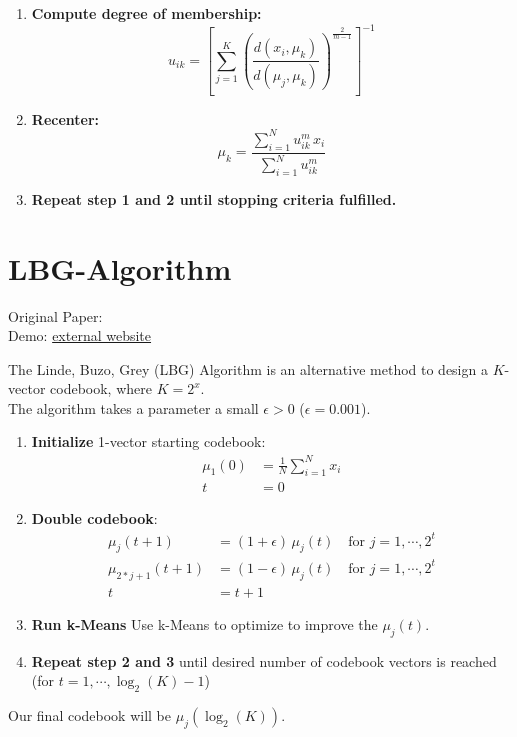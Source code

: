 \begin{enumerate}
\item \textbf{Compute degree of membership:}
	$$u_{ik} = \left[ \sum_{j=1}^K \left( \frac{d(x_i, \mu_k)}{d(\mu_j, \mu_k)} \right)^{\frac{2}{m-1}} \right]^{-1}$$
\item \textbf{Recenter:}
	$$\mu_k = \frac{\sum_{i=1}^N u_{ik}^m \, x_i}{\sum_{i=1}^N u_{ik}^m}$$
\item \textbf{Repeat step 1 and 2 until stopping criteria fulfilled.}
\end{enumerate}

\section{LBG-Algorithm}
Original Paper: \cite{Linde1980}\\
Demo: \href{http://www.data-compression.com/vqanim.shtml}{external website}

The Linde, Buzo, Grey (LBG) Algorithm is an alternative method to design a $K$-vector codebook, where $K=2^x$.\\
The algorithm takes a parameter a small $\epsilon > 0$ (\eg $\epsilon=0.001$).

\begin{enumerate}
\item \textbf{Initialize} 1-vector starting codebook:
	\begin{align}
	\mu_1(0) &= \frac{1}{N} \sum\limits_{i=1}^N x_i\\
	t &= 0
	\end{align}
\item \textbf{Double codebook}:
	\begin{align}
	\mu_j(t+1) &= (1+\epsilon)\, \mu_j(t) \quad \text{for } j=1,\cdots,2^t\\
	\mu_{2*j+1}(t+1) &= (1-\epsilon)\, \mu_j(t) \quad \text{for } j=1,\cdots,2^t\\
	t &= t+1
	\end{align}
\item \textbf{Run k-Means} Use k-Means to optimize to improve the $\mu_j(t)$.
\item \textbf{Repeat step 2 and 3} until desired number of codebook vectors is reached (for $t=1,\cdots,\log_2(K)-1$)
\end{enumerate}

Our final codebook will be $\mu_j(\log_2(K))$.